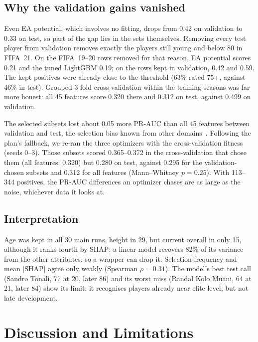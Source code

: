 \documentclass[runningheads]{llncs}
\begin{document}
\subsection{Why the validation gains vanished}

Even EA potential, which involves no fitting, drops from 0.42 on validation to 0.33 on test, so part of the gap lies in the sets themselves. Removing every test player from validation removes exactly the players still young and below 80 in FIFA~21. On the FIFA~19--20 rows removed for that reason, EA potential scores 0.21 and the tuned LightGBM 0.19; on the rows kept in validation, 0.42 and 0.59. The kept positives were already close to the threshold (63\% rated 75+, against 46\% in test). Grouped 3-fold cross-validation within the training seasons was far more honest: all 45 features score 0.320 there and 0.312 on test, against 0.499 on validation.

The selected subsets lost about 0.05 more PR-AUC than all 45 features between validation and test, the selection bias known from other domains~\cite{ambroise2002selection,cawley2010overfitting}. Following the plan's fallback, we re-ran the three optimizers with the cross-validation fitness (seeds 0--3). Those subsets scored 0.365--0.372 in the cross-validation that chose them (all features: 0.320) but 0.280 on test, against 0.295 for the validation-chosen subsets and 0.312 for all features (Mann--Whitney $p = 0.25$). With 113--344 positives, the PR-AUC differences an optimizer chases are as large as the noise, whichever data it looks at.

\subsection{Interpretation}

Age was kept in all 30 main runs, height in 29, but current overall in only 15, although it ranks fourth by SHAP: a linear model recovers 82\% of its variance from the other attributes, so a wrapper can drop it. Selection frequency and mean $|$SHAP$|$ agree only weakly (Spearman $\rho = 0.31$). The model's best test call (Sandro Tonali, 77 at 20, later 86) and its worst miss (Randal Kolo Muani, 64 at 21, later 84) show its limit: it recognises players already near elite level, but not late development.

\section{Discussion and Limitations}
\end{document}
